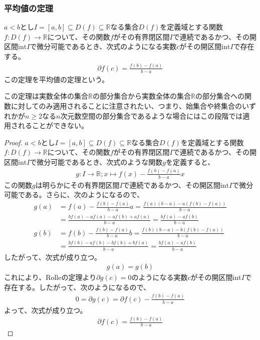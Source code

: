 \documentclass[dvipdfmx]{jsarticle}
\begin{document}
\subsubsection{平均値の定理}%
\begin{thm}[平均値の定理]\label{4.2.2.3}
$a < b$とし$I = [ a,b] \subseteq D(f) \subseteq \mathbb{R}$なる集合$D(f)$を定義域とする関数$f:D(f) \rightarrow \mathbb{R}$について、その関数$f$がその有界閉区間$I$で連続であるかつ、その開区間$\mathrm{int}I$で微分可能であるとき、次式のようになる実数$c$がその開区間$\mathrm{int}I$で存在する。
\begin{align*}
\partial f(c) = \frac{f(b) - f(a)}{b - a}
\end{align*}
この定理を平均値の定理という。
\end{thm}\par
この定理は実数全体の集合$\mathbb{R}$の部分集合から実数全体の集合$\mathbb{R}$の部分集合への関数に対してのみ適用されることに注意されたい、つまり、始集合や終集合のいずれかが$n \geq 2$なる$n$次元数空間の部分集合であるような場合にはこの段階では適用されることができない。
\begin{proof}
$a < b$とし$I = [ a,b] \subseteq D(f) \subseteq \mathbb{R}$なる集合$D(f)$を定義域とする関数$f:D(f) \rightarrow \mathbb{R}$について、その関数$f$がその有界閉区間$I$で連続であるかつ、その開区間$\mathrm{int}I$で微分可能であるとき、次式のような関数$g$を定義すると、
\begin{align*}
g:I \rightarrow \mathbb{R};x \mapsto f(x) - \frac{f(b) - f(a)}{b - a}x
\end{align*}
この関数$g$は明らかにその有界閉区間$I$で連続であるかつ、その開区間$\mathrm{int}I$で微分可能である。さらに、次のようになるので、
\begin{align*}
g(a) &= f(a) - \frac{f(b) - f(a)}{b - a}a = \frac{f(a)(b - a) - a\left( f(b) - f(a) \right)}{b - a}\\
&= \frac{bf(a) - af(a) - af(b) + af(a)}{b - a} = \frac{bf(a) - af(b)}{b - a}\\
g(b) &= f(b) - \frac{f(b) - f(a)}{b - a}b = \frac{f(b)(b - a) - b\left( f(b) - f(a) \right)}{b - a}\\
&= \frac{bf(b) - af(b) - bf(b) + bf(a)}{b - a} = \frac{bf(a) - af(b)}{b - a}
\end{align*}
したがって、次式が成り立つ。
\begin{align*}
g(a) = g(b)
\end{align*}
これにより、Rolleの定理より$\partial g(c) = 0$のようになる実数$c$がその開区間$\mathrm{int}I$で存在する。したがって、次のようになるので、
\begin{align*}
0 = \partial g(c) = \partial f(c) - \frac{f(b) - f(a)}{b - a}
\end{align*}
よって、次式が成り立つ。
\begin{align*}
\partial f(c) = \frac{f(b) - f(a)}{b - a}
\end{align*}
\end{proof}
\end{document}
